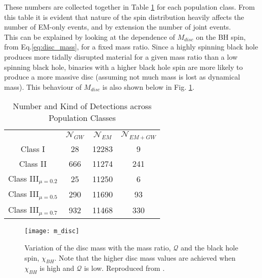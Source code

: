     These numbers are collected together in Table \ref{tab:popln_numbers} for each
    population class. From this table it is evident that nature of the spin distribution
    heavily affects the number of EM-only events, and by extension the number of joint
    events.\\
    This can be explained by looking at the dependence of $M_{disc}$ on the BH
    spin, from Eq.\ref{eq:disc_mass}, for a fixed mass ratio. Since a highly spinning
    black hole produces more tidally disrupted material for a given mass ratio than a
    low spinning black hole, binaries with a higher black hole spin are more likely to
    produce a more massive disc (assuming not much mass is lost as dynamical mass).
    This behaviour of $M_{disc}$ is also shown below in Fig. \ref{fig:m_disc}.

    \begin{table}[H]
        \centering
        \caption{Number and Kind of Detections across Population Classes}
        \begin{tabular}{cccc}
            \toprule

                &
            $\mathcal{N}_{GW}$ &
            $\mathcal{N}_{EM}$ &
            $\mathcal{N}_{EM+GW}$ \\

            Class I & 28 & 12283 & 9 \\

            Class II & 666 & 11274 & 241 \\

            Class III$_{\mu = 0.2}$ &
            25 & 11250 & 6 \\
            Class III$_{\mu = 0.5}$ &
            290 & 11690 & 93 \\
            Class III$_{\mu = 0.7}$ &
            932 & 11468 & 330 \\
            \bottomrule
        \end{tabular}
        \label{tab:popln_numbers}
    \end{table}


    \begin{figure}[H]
        \centering
        \texttt{[image: m\_disc]}
        \caption[Variation of $M_{\mathrm{disc}}$ with $\chi_{BH}$ and $\mathcal{Q}$]{
            Variation of the disc mass with the mass ratio, $\mathcal{Q}$ and the black
            hole spin, $\chi_{BH}$. Note that the higher disc mass values are achieved
            when $\chi_{BH}$ is high and $\mathcal{Q}$ is low. Reproduced from
            \cite{barbieri_2019b}.
        }
        \label{fig:m_disc}
    \end{figure}

